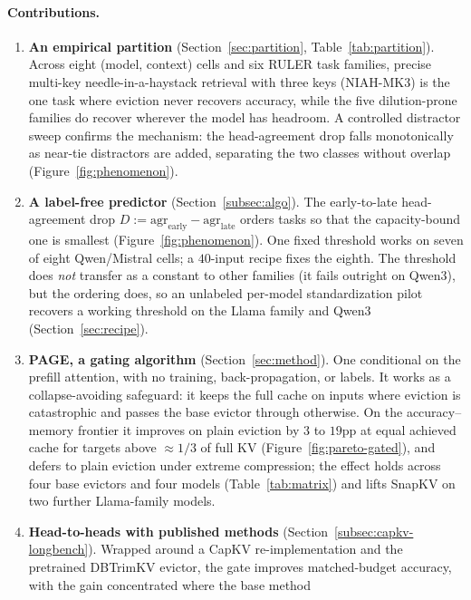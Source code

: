 \documentclass{article}
\newcommand{\method}{PAGE\xspace}
\begin{document}
\paragraph{Contributions.}
\begin{enumerate}
  \item \textbf{An empirical partition} (Section~\ref{sec:partition},
  Table~\ref{tab:partition}). Across eight (model, context) cells and six RULER
  task families, precise multi-key needle-in-a-haystack retrieval with three
  keys (NIAH-MK3) is the one task where
  eviction never recovers accuracy, while the five dilution-prone families do
  recover wherever the model has headroom. A controlled distractor sweep
  confirms the mechanism: the head-agreement drop falls monotonically as near-tie
  distractors are added, separating the two classes without overlap
  (Figure~\ref{fig:phenomenon}).
  \item \textbf{A label-free predictor} (Section~\ref{subsec:algo}). The
  early-to-late head-agreement drop $D := \mathrm{agr}_{\text{early}} -
  \mathrm{agr}_{\text{late}}$ orders tasks so that the capacity-bound one is
  smallest (Figure~\ref{fig:phenomenon}). One fixed threshold works on seven of
  eight Qwen/Mistral cells; a $40$-input recipe fixes the eighth. The threshold
  does \emph{not} transfer as a constant to other families (it fails outright on
  Qwen3), but the ordering does, so an unlabeled per-model standardization pilot
  recovers a working threshold on the Llama family and Qwen3
  (Section~\ref{sec:recipe}).
  \item \textbf{\method, a gating algorithm} (Section~\ref{sec:method}). One
  conditional on the prefill attention, with no training, back-propagation, or
  labels. It works as a collapse-avoiding safeguard: it keeps the full cache on
  inputs where eviction is catastrophic and passes the base evictor through otherwise.
  On the accuracy--memory frontier it improves on plain eviction by $3$ to
  $19$pp at equal achieved cache for targets above $\approx 1/3$ of full KV
  (Figure~\ref{fig:pareto-gated}), and defers to plain eviction under extreme
  compression; the effect holds across four base evictors and four models
  (Table~\ref{tab:matrix}) and lifts SnapKV on two further Llama-family models.
  \item \textbf{Head-to-heads with published methods}
  (Section~\ref{subsec:capkv-longbench}). Wrapped around a CapKV
  re-implementation and the pretrained DBTrimKV evictor, the gate improves
  matched-budget accuracy, with the gain concentrated where the base method

\end{enumerate}
\end{document}
